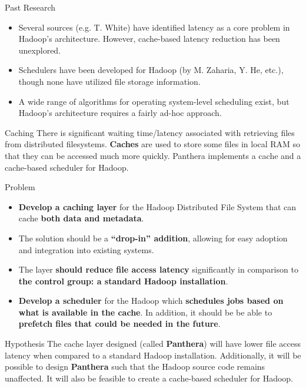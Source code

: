 \documentclass[final]{beamer} %
\begin{document}
\begin{frame}
\begin{columns}[t]
\begin{column}{0.32\textwidth}
	\begin{block}{Past Research}
	\begin{itemize}
		\item Several sources (e.g. T. White) have identified latency as a core problem in Hadoop's architecture. However, cache-based latency reduction has been unexplored.
		\item Schedulers have been developed for Hadoop (by M. Zaharia, Y. He, etc.), though none have utilized file storage information.
		\item A wide range of algorithms for operating system-level scheduling exist, but Hadoop's architecture requires a fairly ad-hoc approach.
	\end{itemize}
	\end{block}
	
	\begin{block}{Caching}
	There is significant waiting time/latency associated with retrieving files from distributed filesystems. \textbf{Caches} are used to store
	some files in local RAM so that they can be accessed much more quickly. Panthera implements a cache and a cache-based scheduler for Hadoop.
	\end{block}
	
    \begin{block}{Problem}
	\begin{itemize}
	 \item \textbf{Develop a caching layer} for the Hadoop Distributed File System that can cache \textbf{both data and metadata}.
	 \item The solution should be a \textbf{``drop-in'' addition}, allowing for easy adoption and integration into existing systems.
	 \item The layer \textbf{should reduce file access latency} significantly in comparison to \textbf{the control group: a standard Hadoop installation}.
	 \item \textbf{Develop a scheduler} for the Hadoop which \textbf{schedules jobs based on what is available in the cache}. In addition, it should be be able to \textbf{prefetch files that could be needed in the future}.
	\end{itemize}

      \end{block}

      \begin{block}{Hypothesis}
       The cache layer designed (called \textbf{Panthera}) will have lower file
       access latency when compared to a standard Hadoop installation. Additionally, it
       will be possible to design \textbf{Panthera} such that the Hadoop source code
       remains unaffected. It will also be feasible to create a cache-based 
       scheduler for Hadoop.
      \end{block}
	  

\end{column}
\end{columns}
\end{frame}
\end{document}
